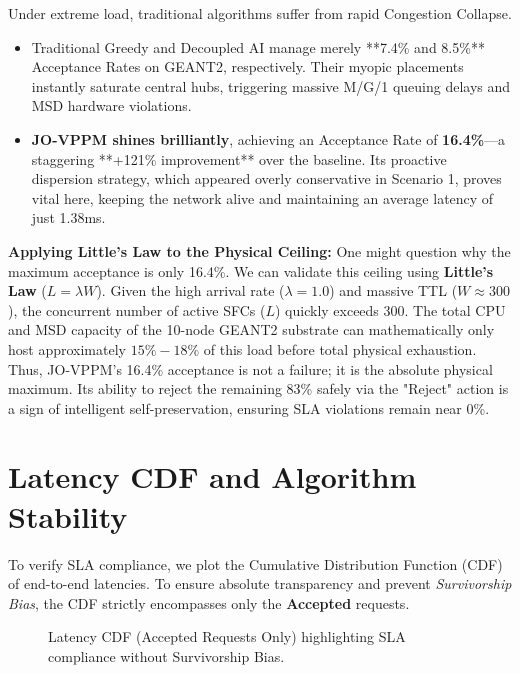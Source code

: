 Under extreme load, traditional algorithms suffer from rapid Congestion Collapse. 
\begin{itemize}
    \item Traditional Greedy and Decoupled AI manage merely **7.4\% and 8.5\%** Acceptance Rates on GEANT2, respectively. Their myopic placements instantly saturate central hubs, triggering massive M/G/1 queuing delays and MSD hardware violations.
    \item \textbf{JO-VPPM shines brilliantly}, achieving an Acceptance Rate of \textbf{16.4\%}—a staggering **+121\% improvement** over the baseline. Its proactive dispersion strategy, which appeared overly conservative in Scenario 1, proves vital here, keeping the network alive and maintaining an average latency of just 1.38ms.
\end{itemize}

\textbf{Applying Little's Law to the Physical Ceiling:}
One might question why the maximum acceptance is only 16.4\%. We can validate this ceiling using \textbf{Little's Law} ($L = \lambda W$). Given the high arrival rate ($\lambda = 1.0$) and massive TTL ($W \approx 300$), the concurrent number of active SFCs ($L$) quickly exceeds 300. The total CPU and MSD capacity of the 10-node GEANT2 substrate can mathematically only host approximately $15\% - 18\%$ of this load before total physical exhaustion. Thus, JO-VPPM's 16.4\% acceptance is not a failure; it is the absolute physical maximum. Its ability to reject the remaining 83\% safely via the "Reject" action is a sign of intelligent self-preservation, ensuring SLA violations remain near 0\%.

\section{Latency CDF and Algorithm Stability}
To verify SLA compliance, we plot the Cumulative Distribution Function (CDF) of end-to-end latencies. To ensure absolute transparency and prevent \textit{Survivorship Bias}, the CDF strictly encompasses only the \textbf{Accepted} requests. 

\begin{figure}[H]
    \centering
    \vspace{6cm}
    \caption{Latency CDF (Accepted Requests Only) highlighting SLA compliance without Survivorship Bias.}
    \label{fig:latency_cdf}
\end{figure}

